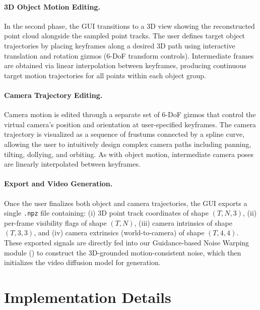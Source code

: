 \paragraph{3D Object Motion Editing.}
In the second phase, the GUI transitions to a 3D view showing the reconstructed point cloud alongside the sampled point tracks. The user defines target object trajectories by placing keyframes along a desired 3D path using interactive translation and rotation gizmos (6-DoF transform controls). Intermediate frames are obtained via linear interpolation between keyframes, producing continuous target motion trajectories for all points within each object group.

\paragraph{Camera Trajectory Editing.}
Camera motion is edited through a separate set of 6-DoF gizmos that control the virtual camera's position and orientation at user-specified keyframes. The camera trajectory is visualized as a sequence of frustums connected by a spline curve, allowing the user to intuitively design complex camera paths including panning, tilting, dollying, and orbiting. As with object motion, intermediate camera poses are linearly interpolated between keyframes.

\paragraph{Export and Video Generation.}
Once the user finalizes both object and camera trajectories, the GUI exports a single \texttt{.npz} file containing: (i) 3D point track coordinates of shape $(T, N, 3)$, (ii) per-frame visibility flags of shape $(T, N)$, (iii) camera intrinsics of shape $(T, 3, 3)$, and (iv) camera extrinsics (world-to-camera) of shape $(T, 4, 4)$. These exported signals are directly fed into our Guidance-based Noise Warping module () to construct the 3D-grounded motion-consistent noise, which then initializes the video diffusion model for generation.

\section{Implementation Details}
\label{sec:supp_impl}


